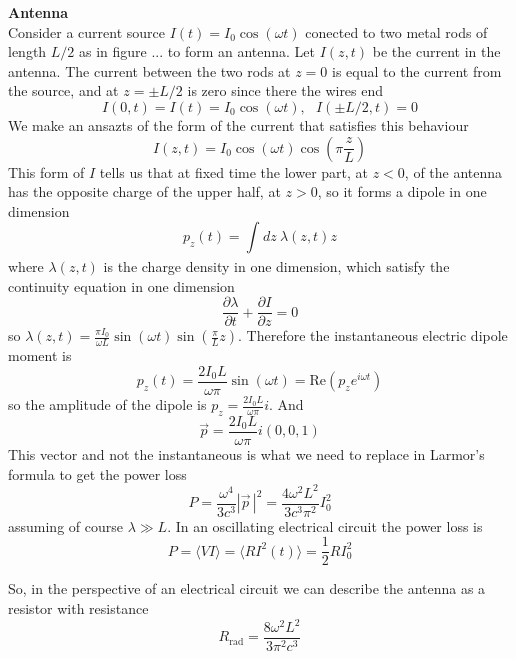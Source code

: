 \documentclass[12pt,a4paper]{article}
\newcommand{\pd}[2]{\frac{\partial #1}{\partial #2}} %
\newcommand{\integral}[3]{\int_{#1}^{#2} d #3 \ } %
\newcommand{\re}{\text{Re}}
\begin{document}
\textbf{Antenna}\\
Consider a current source $I(t) = I_0 \cos (\omega t)$ conected to two metal rods of length $L/2$ as in figure ... to form an antenna. Let $I(z,t)$ be the current in the antenna. The current between the two rods at $z = 0$ is equal to the current from the source, and at $z=\pm L/2$ is zero since there the wires end
\begin{equation}
	I(0,t) = I(t) = I_0 \cos(\omega t), \ \ \  I(\pm L/2,t) = 0
\end{equation}
We make an ansazts of the form of the current that satisfies this behaviour
\begin{equation}
	I(z,t) = I_0\cos(\omega t) \cos\left(\pi \frac{z}{L}\right)
\end{equation}
This form of $I$ tells us that at fixed time the lower part, at $z<0$, of the antenna has the opposite charge of the upper half, at $z>0$, so it forms a dipole in one dimension
\begin{equation}
	p_z(t) = \integral{}{}{z} \lambda (z,t) z
\end{equation}
where $\lambda (z,t)$ is the charge density in one dimension, which satisfy the continuity equation in one dimension
\begin{equation}
	\pd{\lambda}{t}+\pd{I}{z} = 0
\end{equation}
so $\lambda (z,t) = \frac{\pi I_0}{\omega L}\sin(\omega t)\sin(\frac{\pi}{L}z)$. Therefore the instantaneous electric dipole moment is
\begin{equation}
	p_z(t) = \frac{2I_0L}{\omega\pi}\sin(\omega t) = \re (p_z e^{i\omega t})
\end{equation}
so the amplitude of the dipole is $p_z = \frac{2I_0L}{\omega\pi}i$. And
\begin{equation}
	\vec{p} = \frac{2I_0L}{\omega\pi}i(0,0,1)
\end{equation}
This vector and not the instantaneous is what we need to replace in Larmor's formula to get the power loss
\begin{equation}
	P = \frac{\omega^4}{3c^3}|\vec{p}\,|^2 = \frac{4\omega^2L^2}{3c^3\pi^2}I_0^2
\end{equation}
assuming of course $\lambda\gg L$. In an oscillating electrical circuit the power loss is
\begin{equation}
	P = \langle V I \rangle = \langle R I^2(t)\rangle = \frac{1}{2}R I_0^2
\end{equation}

So, in the perspective of an electrical circuit we can describe the antenna as a resistor with resistance 
\begin{equation}
R_{\text{rad}} = \frac{8\omega^2L^2}{3\pi^2c^3}
\end{equation}
\end{document}
